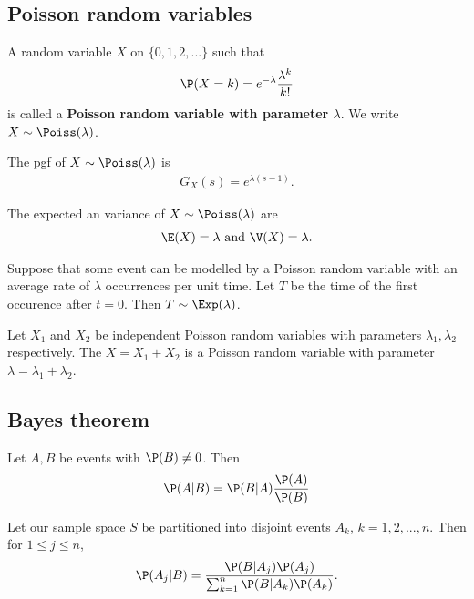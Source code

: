 \documentclass{article}
\begin{document}
\subsection{Poisson random variables}
\begin{definition}
	A random variable $X$ on $\{0,1,2,...\}$ such that
	\begin{align*}
		\P(X=k) = e^{-\lambda}\frac{\lambda^k}{k!}
	\end{align*}
	is called a \textbf{Poisson random variable with parameter $\lambda$}.
	We write $X\sim\Poiss(\lambda)$.
\end{definition}
\begin{lemma}
	The pgf of $X\sim\Poiss(\lambda)$ is
	\begin{align*}
		G_X(s) = e^{\lambda(s-1)}.
	\end{align*}
\end{lemma}
\begin{lemma}
	The expected an variance of $X\sim\Poiss(\lambda)$ are
	\begin{align*}
		\E(X) = \lambda \text{ and } \V(X) = \lambda.
	\end{align*}
\end{lemma}
\begin{theorem}
	Suppose that some event can be modelled by a Poisson random variable
	with an average rate of $\lambda$ occurrences per unit time. Let $T$
	be the time of the first occurence after $t=0$. Then $T\sim\Exp(\lambda)$.
\end{theorem}
\begin{theorem}
	Let $X_1$ and $X_2$ be independent Poisson random variables with parameters
	$\lambda_1, \lambda_2$ respectively. The $X=X_1 + X_2$ is a Poisson random
	variable with parameter $\lambda=\lambda_1+\lambda_2$.
\end{theorem}
\subsection{Bayes theorem}
\begin{theorem}
	Let $A,B$ be events with $\P(B)\not=0$. Then
	\begin{align*}
		\P(A|B)=\P(B|A)\frac{\P(A)}{\P(B)}
	\end{align*}
\end{theorem}
\begin{theorem}
	Let our sample space $S$ be partitioned into disjoint events $A_k$,
	$k=1,2,...,n$. Then for $1\leq j\leq n$,
	\begin{align*}
		\P(A_j|B)=\frac{\P(B|A_j)\P(A_j)}{\sum_{k=1}^n \P(B|A_k)\P(A_k)}.
	\end{align*}
\end{theorem}
\end{document}
